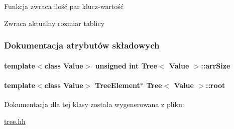 Funkcja zwraca ilość par klucz-\/wartość 

\begin{DoxyReturn}{Zwraca}
aktualny rozmiar tablicy 
\end{DoxyReturn}


\subsubsection{Dokumentacja atrybutów składowych}
\hypertarget{class_tree_aff00e7392acb5a5610eac7a3959bdb01}{
\paragraph[{arr\-Size}]{\setlength{\rightskip}{0pt plus 5cm}template$<$class Value$>$ unsigned int {\bf Tree}$<$ Value $>$\-::arr\-Size\hspace{0.3cm}{\ttfamily [private]}}}\label{class_tree_aff00e7392acb5a5610eac7a3959bdb01}
\hypertarget{class_tree_aa9e3ed038d05213099bc5e0a26ecc219}{
\paragraph[{root}]{\setlength{\rightskip}{0pt plus 5cm}template$<$class Value$>$ {\bf Tree\-Element}$\ast$ {\bf Tree}$<$ Value $>$\-::root\hspace{0.3cm}{\ttfamily [private]}}}\label{class_tree_aa9e3ed038d05213099bc5e0a26ecc219}


Dokumentacja dla tej klasy została wygenerowana z pliku\-:\begin{DoxyCompactItemize}
\item 
\hyperlink{tree_8hh}{tree.\-hh}\end{DoxyCompactItemize}
